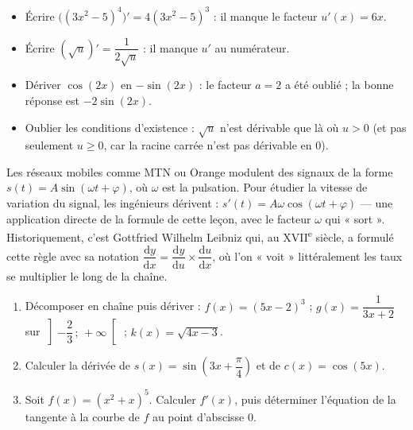 \documentclass[11pt]{article}
\begin{document}
\begin{attention}
\begin{itemize}
\item Écrire $\big((3x^2-5)^4\big)' = 4(3x^2-5)^3$ : il manque le facteur $u'(x) = 6x$.
\item Écrire $\left(\sqrt{u}\right)' = \dfrac{1}{2\sqrt{u}}$ : il manque $u'$ au numérateur.
\item Dériver $\cos(2x)$ en $-\sin(2x)$ : le facteur $a = 2$ a été oublié ; la bonne réponse est $-2\sin(2x)$.
\item Oublier les conditions d'existence : $\sqrt{u}$ n'est dérivable que là où $u > 0$ (et pas seulement $u \geq 0$, car la racine carrée n'est pas dérivable en $0$).
\end{itemize}
\end{attention}

\begin{savaistu}
Les réseaux mobiles comme MTN ou Orange modulent des signaux de la forme $s(t) = A\sin(\omega t + \varphi)$, où $\omega$ est la pulsation. Pour étudier la vitesse de variation du signal, les ingénieurs dérivent : $s'(t) = A\omega\cos(\omega t + \varphi)$ — une application directe de la formule de cette leçon, avec le facteur $\omega$ qui « sort ». Historiquement, c'est Gottfried Wilhelm Leibniz qui, au XVII\textsuperscript{e} siècle, a formulé cette règle avec sa notation $\dfrac{\mathrm{d}y}{\mathrm{d}x} = \dfrac{\mathrm{d}y}{\mathrm{d}u} \times \dfrac{\mathrm{d}u}{\mathrm{d}x}$, où l'on « voit » littéralement les taux se multiplier le long de la chaîne.
\end{savaistu}

\begin{exercice}
\begin{enumerate}
\item Décomposer en chaîne puis dériver : $f(x) = (5x - 2)^3$ ; $g(x) = \dfrac{1}{3x + 2}$ sur $\left]-\dfrac{2}{3}\,;\,+\infty\right[$ ; $k(x) = \sqrt{4x - 3}$.
\item Calculer la dérivée de $s(x) = \sin\left(3x + \dfrac{\pi}{4}\right)$ et de $c(x) = \cos(5x)$.
\item Soit $f(x) = (x^2 + x)^5$. Calculer $f'(x)$, puis déterminer l'équation de la tangente à la courbe de $f$ au point d'abscisse $0$.
\end{enumerate}
\end{exercice}
\end{document}
